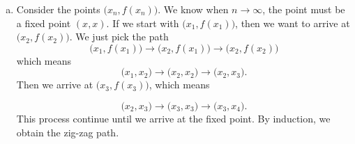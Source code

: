 \begin{Exercise}
\begin{enumerate}[(a)]
		\item
		\begin{solution}
			Consider the points $\big(x_n, f(x_n)\big)$.
			We know when $n\to\infty$, the point must be a fixed point $(x, x)$.
			If we start with $\big(x_1, f(x_1)\big)$, then we want to arrive at $\big(x_2, f(x_2)\big)$. We just pick the path
			$$
			\big(x_1, f(x_1)\big) \to \big(x_2, f(x_1)\big) \to \big(x_2, f(x_2)\big)
			$$
			which means
			$$
			\big(x_1, x_2\big) \to \big(x_2, x_2\big) \to \big(x_2, x_3\big).
			$$
			Then we arrive at $\big(x_3, f(x_3)\big)$, which means
			
			$$
			\big(x_2, x_3\big) \to \big(x_3, x_3\big) \to \big(x_3, x_4\big).
			$$
			This process continue until we arrive at the fixed point.
			By induction, we obtain the zig-zag path.
		\end{solution}
	\end{enumerate}
\end{Exercise}